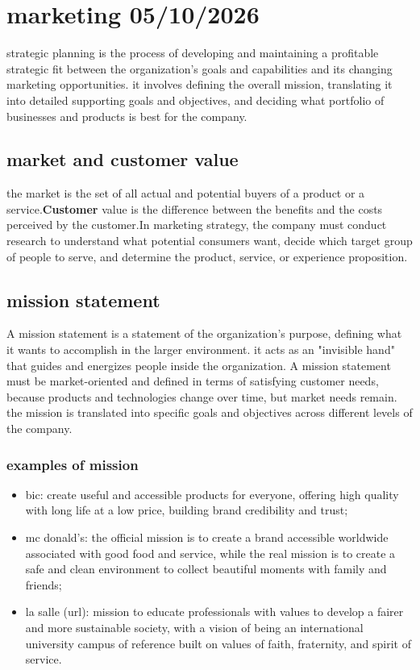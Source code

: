 \documentclass[12pt,a4paper]{report}
\begin{document}
\chapter{marketing 05/10/2026}
strategic planning is the process of developing and maintaining a profitable strategic fit between the organization's goals and capabilities and its changing marketing opportunities. it involves defining the overall mission, translating it into detailed supporting goals and objectives, and deciding what portfolio of businesses and products is best for the company.   
\section{market and customer value}
the market is the set of all actual and potential buyers of a product or a service.\textbf {Customer } value is the difference between the benefits and the costs perceived by the customer.In marketing strategy, the company must conduct research to understand what potential consumers want, decide which target group of people to serve, and determine the product, service, or experience proposition.   
\section{mission statement}
A mission statement is a statement of the organization's purpose, defining what it wants to accomplish in the larger environment. it acts as an "invisible hand" that guides and energizes people inside the organization.
A mission statement must be market-oriented and defined in terms of satisfying customer needs, because products and technologies change over time, but market needs remain.
the mission is translated into specific goals and objectives across different levels of the company.   
\subsection{examples of mission}
\begin{itemize}
\item bic: create useful and accessible products for everyone, offering high quality with long life at a low price, building brand credibility and trust;
\item mc donald's: the official mission is to create a brand accessible worldwide associated with good food and service, while the real mission is to create a safe and clean environment to collect beautiful moments with family and friends;
\item la salle (url): mission to educate professionals with values to develop a fairer and more sustainable society, with a vision of being an international university campus of reference built on values of faith, fraternity, and spirit of service.
\end{itemize}   
\end{document}
